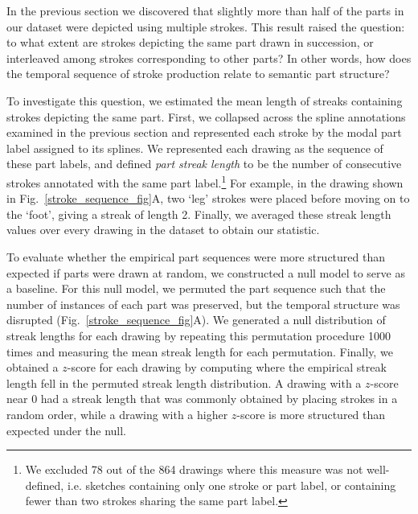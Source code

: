 \documentclass[10pt,letterpaper]{article}
\begin{document}
In the previous section we discovered that slightly more than half of the parts in our dataset were depicted using multiple strokes. This result raised the question: to what extent are strokes depicting the same part drawn in succession, or interleaved among strokes corresponding to other parts?
In other words, how does the temporal sequence of stroke production relate to semantic part structure?


To investigate this question, we estimated the mean length of streaks containing strokes depicting the same part.
First, we collapsed across the spline annotations examined in the previous section and represented each stroke by the modal part label assigned to its splines.
We represented each drawing as the sequence of these part labels, and defined \textit{part streak length} to be the number of consecutive strokes annotated with the same part label.\footnote{We excluded 78 out of the 864 drawings where this measure was not well-defined, i.e. sketches containing only one stroke or part label, or containing fewer than two strokes sharing the same part label.}
For example, in the drawing shown in Fig.~\ref{stroke_sequence_fig}A, two `leg' strokes were placed before moving on to the `foot', giving a streak of length 2.
Finally, we averaged these streak length values over every drawing in the dataset to obtain our statistic. 

To evaluate whether the empirical part sequences were more structured than expected if parts were drawn at random, we constructed a null model to serve as a baseline.
For this null model, we permuted the part sequence such that the number of instances of each part was preserved, but the temporal structure was disrupted (Fig.~\ref{stroke_sequence_fig}A).
We generated a null distribution of streak lengths for each drawing by repeating this permutation procedure 1000 times and measuring the mean streak length for each permutation.
Finally, we obtained a $z$-score for each drawing by computing where the empirical streak length fell in the permuted streak length distribution.
A drawing with a $z$-score near 0 had a streak length that was commonly obtained by placing strokes in a random order, while a drawing with a higher $z$-score is more structured than expected under the null.
\end{document}
